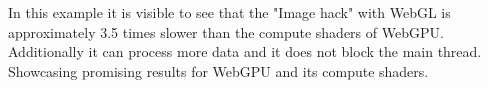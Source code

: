 In this example it is visible to see that the "Image hack" with WebGL is approximately 3.5 times slower than the compute shaders of WebGPU.
Additionally it can process more data and it does not block the main thread.
Showcasing promising results for WebGPU and its compute shaders.

\label{chap:Performance}

